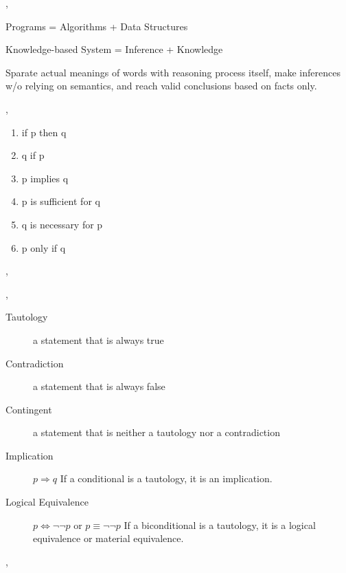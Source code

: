 \documentclass{article}
\begin{document}
	\sep
	

	\answer

	Programs = Algorithms + Data Structures

	Knowledge-based System = Inference + Knowledge

	Sparate actual meanings of words with reasoning process itself, make inferences w/o relying on semantics, and reach valid conclusions based on facts only.

	\sep


	\answer

	\begin{enumerate}
		\item if p then q
		\item q if p
		\item p implies q
		\item p is sufficient for q
		\item q is necessary for p
		\item p only if q
	\end{enumerate}

	\sep


	\sep


	\answer

	\begin{description}
		\item[Tautology] a statement that is always true
		\item[Contradiction] a statement that is always false
		\item[Contingent] a statement that is neither a tautology nor a contradiction
		\item[Implication] $p\Rightarrow q$ If a conditional is a tautology, it is an implication.
		\item[Logical Equivalence] $p\Leftrightarrow \lnot\lnot p$ or $p\equiv \lnot\lnot p$ If a biconditional is a tautology, it is a logical equivalence or material equivalence.
	\end{description}

	\sep
	

	\answer
\end{document}
